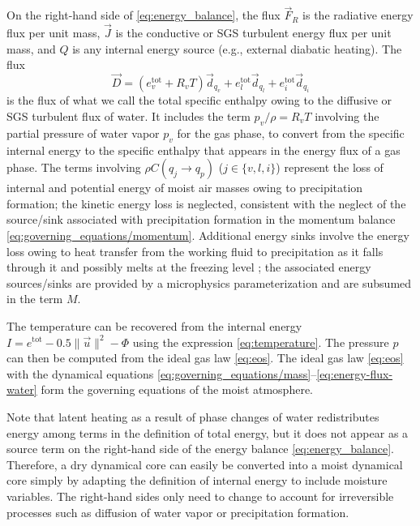 \documentclass{article}
\begin{document}
On the right-hand side of \eqref{eq:energy_balance}, the flux $\vec{F}_R$ is the radiative energy flux per unit mass, $\vec{J}$ is the conductive or SGS turbulent energy flux per unit mass, and $Q$ is any internal energy source (e.g., external diabatic heating). The flux 
\begin{equation}\label{eq:energy-flux-water}
\vec{D} = (e_v^{\mathrm{tot}} + R_v T) \vec{d}_{q_v} + e_l^{\mathrm{tot}} \vec{d}_{q_l} +  e_i^{\mathrm{tot}} \vec{d}_{q_i}
\end{equation}
is the flux of what we call the total specific enthalpy owing to the diffusive or SGS turbulent flux of water. It includes the term $p_v/\rho = R_v T$ involving the partial pressure of water vapor $p_v$ for the gas phase, to convert from the specific internal energy to the specific enthalpy that appears in the energy flux of a gas phase. The terms involving $\rho C(q_j \rightarrow q_p)$ ($j \in \{ v, l, i \}$) represent the loss of internal and potential energy of moist air masses owing to precipitation formation; the kinetic energy loss is neglected, consistent with the neglect of the source/sink associated with precipitation formation in the momentum balance \eqref{eq:governing_equations/momentum}. Additional energy sinks involve the energy loss owing to heat transfer from the working fluid to precipitation as it falls through it and possibly melts at the freezing level \citep{Raymond13b}; the associated energy sources/sinks are provided by a microphysics parameterization and are subsumed in the term $M$.

The temperature can be recovered from the internal energy $I = e^{\mathrm{tot}} - 0.5 \| \vec{u} \|^2 - \Phi$ using the expression \eqref{eq:temperature}. The pressure $p$ can then be computed from the ideal gas law \eqref{eq:eos}. The ideal gas law \eqref{eq:eos} with the dynamical equations \eqref{eq:governing_equations/mass}--\eqref{eq:energy-flux-water} form the governing equations of the moist atmosphere.

Note that latent heating as a result of phase changes of water redistributes energy among terms in the definition of total energy, but it does not appear as a source term on the right-hand side of the energy balance \eqref{eq:energy_balance}. Therefore, a dry dynamical core can easily be converted into a moist dynamical core simply by adapting the definition of internal energy to include moisture variables. The right-hand sides only need to change to account for irreversible processes such as diffusion of water vapor or precipitation formation. 
\end{document}
